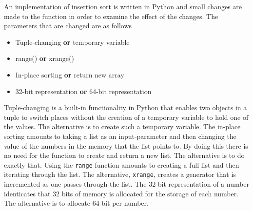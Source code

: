An implementation of insertion sort is written in Python and small changes are made to the function in order to examine the effect of the changes. The parameters that are changed are as follows

\begin{itemize}
\item Tuple-changing \textbf{or} temporary variable
\item range() \textbf{or} xrange()
\item In-place sorting \textbf{or} return new array
\item 32-bit representation \textbf{or} 64-bit representation
\end{itemize}

Tuple-changing is a built-in functionality in Python that enables two objects in a tuple to switch places without the creation of a temporary variable to hold one of the values. The alternative is to create such a temporary variable.
The in-place sorting amounts to taking a list as an input-parameter and then changing the value of the numbers in the memory that the list points to. By doing this there is no need for the function to create and return a new list. The alternative is to do exactly that.
Using the \texttt{range} function amounts to creating a full list and then iterating through the list. The alternative, \texttt{xrange}, creates a generator that is incremented as one passes through the list.
The 32-bit representation of a number identicates that 32 bits of memory is allocated for the storage of each number. The alternative is to allocate 64 bit per number. 